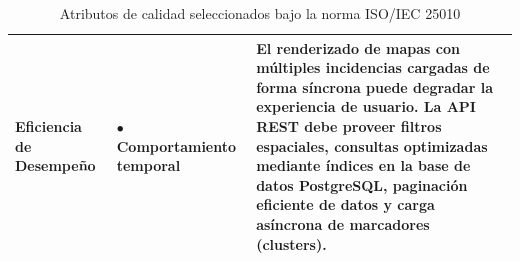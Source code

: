 \begin{table}[H]
\begin{tabularx}{\textwidth}{p{3.0cm} p{4.2cm} X}
\midrule
\textbf{Eficiencia de Desempeño} & 
$\bullet$ Comportamiento temporal & 
El renderizado de mapas con múltiples incidencias cargadas de forma síncrona puede degradar la experiencia de usuario. La API REST debe proveer filtros espaciales, consultas optimizadas mediante índices en la base de datos PostgreSQL, paginación eficiente de datos y carga asíncrona de marcadores (clusters). \\
\bottomrule
\end{tabularx}
\caption{Atributos de calidad seleccionados bajo la norma ISO/IEC 25010}
\label{tab:atributos_calidad}
\end{table}